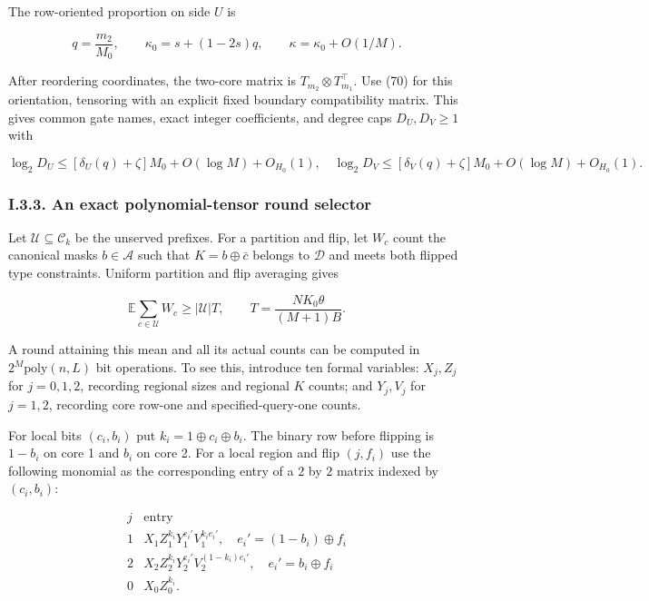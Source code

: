 The row-oriented proportion on side \(U\) is

\[
q=\frac{m_2}{M_0},\qquad
\kappa_0=s+(1-2s)q,\qquad
\kappa=\kappa_0+O(1/M).
\tag{79}
\]

After reordering coordinates, the two-core matrix is \(T_{m_2}\otimes T_{m_1}^{\top}\). Use (70) for this orientation, tensoring with an explicit fixed boundary compatibility matrix. This gives common gate names, exact integer coefficients, and degree caps \(D_U,D_V\ge1\) with

\[
\log_2 D_U\le[\delta_U(q)+\zeta]M_0+O(\log M)+O_{H_0}(1),
\quad
\log_2 D_V\le[\delta_V(q)+\zeta]M_0+O(\log M)+O_{H_0}(1).
\tag{80}
\]

\hypertarget{af-a9ec399514-i.3.3.-an-exact-polynomial-tensor-round-selector}{%
\subsubsection{I.3.3. An exact polynomial-tensor round selector}\label{af-a9ec399514-i.3.3.-an-exact-polynomial-tensor-round-selector}}

Let \(\mathcal U\subseteq\mathcal C_k\) be the unserved prefixes. For a partition and flip, let \(W_c\) count the canonical masks \(b\in\mathcal A\) such that \(K=b\oplus\bar c\) belongs to \(\mathcal D\) and meets both flipped type constraints. Uniform partition and flip averaging gives

\[
\mathbb E\sum_{c\in\mathcal U}W_c
\ge |\mathcal U|T,
\qquad
T=\frac{NK_0\theta}{(M+1)B}.
\tag{81}
\]

A round attaining this mean and all its actual counts can be computed in \(2^M\mathrm{poly}(n,L)\) bit operations. To see this, introduce ten formal variables: \(X_j,Z_j\) for \(j=0,1,2\), recording regional sizes and regional \(K\) counts; and \(Y_j,V_j\) for \(j=1,2\), recording core row-one and specified-query-one counts.

For local bits \((c_i,b_i)\) put \(k_i=1\oplus c_i\oplus b_i\). The binary row before flipping is \(1-b_i\) on core 1 and \(b_i\) on core 2. For a local region and flip \((j,f_i)\) use the following monomial as the corresponding entry of a \(2\) by \(2\) matrix indexed by \((c_i,b_i)\):

\[
\begin{array}{c|c}
j&\text{entry}\\ \hline
1&X_1Z_1^{k_i}Y_1^{e_i'}V_1^{k_i e_i'},
\quad e_i'=(1-b_i)\oplus f_i\\
2&X_2Z_2^{k_i}Y_2^{e_i'}V_2^{(1-k_i)e_i'},
\quad e_i'=b_i\oplus f_i\\
0&X_0Z_0^{k_i}.
\end{array}
\tag{82}
\]

